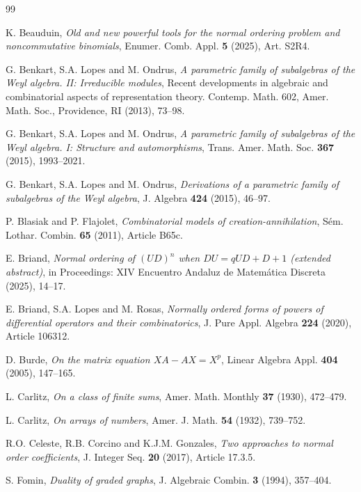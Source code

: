 \documentclass[10pt]{amsart}
\begin{document}
\begin{thebibliography}{99}

K. Beauduin, \emph{Old and new powerful tools for the normal ordering problem and noncommutative binomials}, Enumer. Comb. Appl. {\bf 5} (2025), Art. S2R4. 

G. Benkart, S.A. Lopes and M. Ondrus, {\em A parametric family of subalgebras of the Weyl algebra. II: Irreducible modules}, Recent developments in algebraic and combinatorial aspects of representation theory. Contemp. Math. 602, Amer. Math. Soc., Providence, RI (2013), 73--98.

G. Benkart, S.A. Lopes and M. Ondrus, {\em A parametric family of subalgebras of the Weyl algebra. I: Structure and automorphisms}, Trans. Amer. Math. Soc. {\bf 367} (2015), 1993--2021.

G. Benkart, S.A. Lopes and M. Ondrus, {\em Derivations of a parametric family of subalgebras of the Weyl algebra}, J. Algebra {\bf 424} (2015), 46--97.

P. Blasiak and P. Flajolet, {\em Combinatorial models of creation-annihilation}, S{\'e}m. Lothar. Combin. {\bf 65} (2011), Article B65c.

E. Briand, \emph{Normal ordering of $(UD)^n$ when $DU=qUD+D+1$ (extended abstract)}, in Proceedings: XIV Encuentro Andaluz de Matemática Discreta (2025), 14--17.

E. Briand, S.A. Lopes and M. Rosas, \emph{Normally ordered forms of powers of differential operators and their combinatorics}, J. Pure Appl. Algebra {\bf 224} (2020), Article 106312.

D. Burde, \emph{On the matrix equation $XA-AX = X^p$}, Linear Algebra Appl. {\bf 404} (2005), 147--165. 

L. Carlitz, \emph{On a class of finite sums}, Amer. Math. Monthly \textbf{37} (1930), 472–479.

L. Carlitz, \emph{On arrays of numbers}, Amer. J. Math. \textbf{54} (1932), 739–752.

R.O. Celeste, R.B. Corcino and K.J.M. Gonzales, {\em Two approaches to normal order coefficients}, J. Integer Seq. {\bf 20} (2017), Article 17.3.5.

S. Fomin, \emph{Duality of graded graphs}, J. Algebraic Combin. \textbf{3} (1994), 357--404.


\end{thebibliography}
\end{document}
